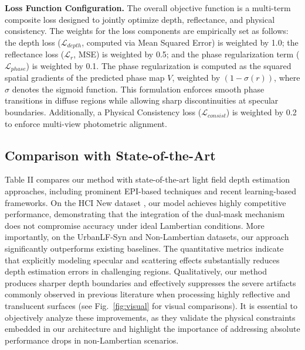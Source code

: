 \documentclass[lettersize,journal]{IEEEtran}
\begin{document}
\textbf{Loss Function Configuration.} 
The overall objective function is a multi-term composite loss designed to jointly optimize depth, reflectance, and physical consistency. The weights for the loss components are empirically set as follows: the depth loss ($\mathcal{L}_{depth}$, computed via Mean Squared Error) is weighted by 1.0; the reflectance loss ($\mathcal{L}_{r}$, MSE) is weighted by 0.5; and the phase regularization term ($\mathcal{L}_{phase}$) is weighted by 0.1. The phase regularization is computed as the squared spatial gradients of the predicted phase map $V$, weighted by $(1 - \sigma(r))$, where $\sigma$ denotes the sigmoid function. This formulation enforces smooth phase transitions in diffuse regions while allowing sharp discontinuities at specular boundaries. Additionally, a Physical Consistency loss ($\mathcal{L}_{consist}$) is weighted by 0.2 to enforce multi-view photometric alignment.

\subsection{Comparison with State-of-the-Art}

Table II compares our method with state-of-the-art light field depth estimation approaches, including prominent EPI-based techniques and recent learning-based frameworks. On the HCI New dataset \cite{ng2005}, our model achieves highly competitive performance, demonstrating that the integration of the dual-mask mechanism does not compromise accuracy under ideal Lambertian conditions. More importantly, on the UrbanLF-Syn \cite{blinn1977} and Non-Lambertian \cite{honauer2016} datasets, our approach significantly outperforms existing baselines. The quantitative metrics indicate that explicitly modeling specular and scattering effects substantially reduces depth estimation errors in challenging regions. Qualitatively, our method produces sharper depth boundaries and effectively suppresses the severe artifacts commonly observed in previous literature \cite{wanner2014} when processing highly reflective and translucent surfaces (see Fig.~\ref{fig:visual} for visual comparisons). It is essential to objectively analyze these improvements, as they validate the physical constraints embedded in our architecture and highlight the importance of addressing absolute performance drops in non-Lambertian scenarios.

\begin{table}[!t]
\caption{Quantitative Comparison with State-of-the-Art Methods}\label{tab:sota}
\centering\small
{}
\end{table}
\end{document}

